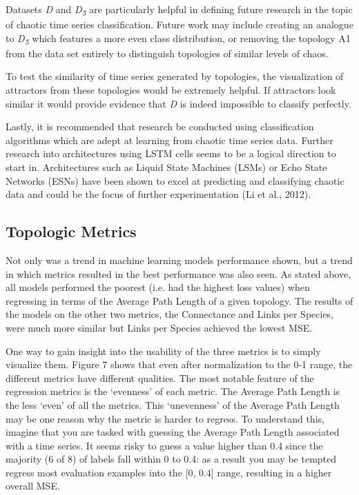 \documentclass[letterpaper, 10 pt, conference]{ieeeconf}  %
\begin{document}
    Datasets \textit{D} and \textit{D\textsubscript{5}} are particularly helpful in defining future research in the topic of chaotic time series classification. Future work may include creating an analogue to \textit{D\textsubscript{5}} which features a more even class distribution, or removing the topology A1 from the data set entirely to distinguish topologies of similar levels of chaos. 

    To test the similarity of time series generated by topologies, the visualization of attractors from these topologies would be extremely helpful. If attractors look similar it would provide evidence that \textit{D} is indeed impossible to classify perfectly. 
    
    Lastly, it is recommended that research be conducted using classification algorithms which are adept at learning from chaotic time series data. Further research into architectures using LSTM cells seems to be a logical direction to start in. Architectures such as Liquid State Machines (LSMs) or Echo State Networks (ESNs) have been shown to excel at predicting and classifying chaotic data and could be the focus of further experimentation (Li et al., 2012). 

\subsection{Topologic Metrics}

    Not only was a trend in machine learning models performance shown, but a trend in which metrics resulted in the best performance was also seen. As stated above, all models performed the poorest (i.e. had the highest loss values) when regressing in terms of the Average Path Length of a given topology. The results of the models on the other two metrics, the Connectance and Links per Species, were much more similar but Links per Species achieved the lowest MSE. 

    One way to gain insight into the usability of the three metrics is to simply visualize them. Figure 7 shows that even after normalization to the 0-1 range, the different metrics have different qualities. The most notable feature of the regression metrics is the ‘evenness’ of each metric. The Average Path Length is the less ‘even’ of all the metrics. This ‘unevenness’ of the Average Path Length may be one reason why the metric is harder to regress. To understand this, imagine that you are tasked with guessing the Average Path Length associated with a time series. It seems risky to guess a value higher than 0.4 since the majority (6 of 8) of labels fall within 0 to 0.4: as a result you may be tempted regress most evaluation examples into the [0, 0.4] range, resulting in a higher overall MSE. 
\end{document}
